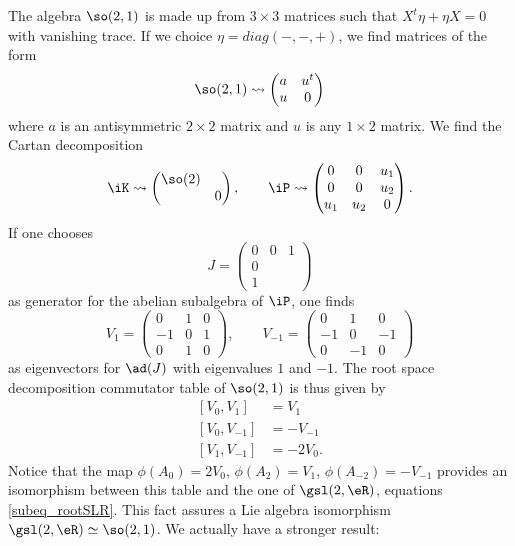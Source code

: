 The algebra $\so(2,1)$ is made up from $3\times 3$ matrices such that $X^t\eta+\eta X=0$ with vanishing trace. If we choice $\eta=diag(-,-,+)$, we find matrices of the form
\[
	\so(2,1)\leadsto\begin{pmatrix}
		a & u^t \\
		u & 0
	\end{pmatrix}
\]
where $a$ is an antisymmetric $2\times 2$ matrix and $u$ is any $1\times 2$ matrix. We find the Cartan decomposition
\[
	\iK\leadsto\begin{pmatrix}
		\so(2) \\&0
	\end{pmatrix},\qquad
	\iP\leadsto\begin{pmatrix}
		0   & 0   & u_1 \\
		0   & 0   & u_2 \\
		u_1 & u_2 & 0
	\end{pmatrix}.
\]
If one chooses
\[
	J=\begin{pmatrix}
		0 & 0 & 1 \\0\\1
	\end{pmatrix}
\]
as generator for the abelian subalgebra of $\iP$, one finds
\[
	V_1=
	\begin{pmatrix}
		0  & 1 & 0 \\
		-1 & 0 & 1 \\
		0  & 1 & 0
	\end{pmatrix},\qquad
	V_{-1}=
	\begin{pmatrix}
		0  & 1  & 0  \\
		-1 & 0  & -1 \\
		0  & -1 & 0
	\end{pmatrix}
\]
as eigenvectors for $\ad(J)$ with eigenvalues $1$ and $-1$. The root space decomposition commutator table of $\so(2,1)$ is thus given by
\begin{subequations}
	\begin{align}
		[V_0,V_1]    & =V_1     \\
		[V_0,V_{-1}] & =-V_{-1} \\
		[V_1,V_{-1}] & =-2V_0.
	\end{align}
\end{subequations}
Notice that the map $\phi(A_0)=2V_0$, $\phi(A_2)=V_1$, $\phi(A_{-2})=-V_{-1}$ provides an isomorphism between this table and the one of $\gsl(2,\eR)$, equations \eqref{subeq_rootSLR}. This fact assures a Lie algebra isomorphism $\gsl(2,\eR)\simeq\so(2,1)$. We actually have a stronger result:

